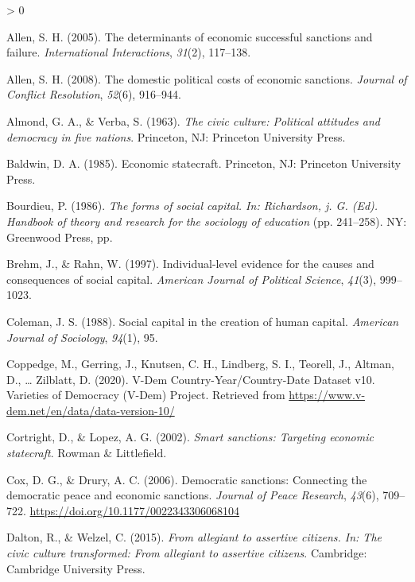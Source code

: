\documentclass[
  english,
  man]{apa6}
\newlength{\cslhangindent}
\newenvironment{CSLReferences}[2] %
 {%
  \setlength{\parindent}{0pt}
  \ifodd #1 \everypar{\setlength{\hangindent}{\cslhangindent}}\ignorespaces\fi
  \ifnum #2 > 0
  \setlength{\parskip}{#2\baselineskip}
  \fi
 }%
 {}
\begin{document}
\hypertarget{refs}{}
\begin{CSLReferences}{1}{0}
\leavevmode\hypertarget{ref-allen2005a}{}%
Allen, S. H. (2005). The determinants of economic successful sanctions and failure. \emph{International Interactions}, \emph{31}(2), 117--138.

\leavevmode\hypertarget{ref-allen2008a}{}%
Allen, S. H. (2008). The domestic political costs of economic sanctions. \emph{Journal of Conflict Resolution}, \emph{52}(6), 916--944.

\leavevmode\hypertarget{ref-a1963a}{}%
Almond, G. A., \& Verba, S. (1963). \emph{The civic culture: Political attitudes and democracy in five nations}. Princeton, NJ: Princeton University Press.

\leavevmode\hypertarget{ref-baldwin1985a}{}%
Baldwin, D. A. (1985). Economic statecraft. Princeton, NJ: Princeton University Press.

\leavevmode\hypertarget{ref-bourdieu1986a}{}%
Bourdieu, P. (1986). \emph{The forms of social capital. In: Richardson, j. G. (Ed). Handbook of theory and research for the sociology of education} (pp. 241--258). NY: Greenwood Press, pp.

\leavevmode\hypertarget{ref-brehm1997a}{}%
Brehm, J., \& Rahn, W. (1997). Individual-level evidence for the causes and consequences of social capital. \emph{American Journal of Political Science}, \emph{41}(3), 999--1023.

\leavevmode\hypertarget{ref-coleman1988a}{}%
Coleman, J. S. (1988). Social capital in the creation of human capital. \emph{American Journal of Sociology}, \emph{94}(1), 95.

\leavevmode\hypertarget{ref-coppedge2020a}{}%
Coppedge, M., Gerring, J., Knutsen, C. H., Lindberg, S. I., Teorell, J., Altman, D., \ldots{} Zilblatt, D. (2020). {V-Dem Country-Year/Country-Date Dataset v10}. Varieties of Democracy (V-Dem) Project. Retrieved from \url{https://www.v-dem.net/en/data/data-version-10/}

\leavevmode\hypertarget{ref-cortright2002a}{}%
Cortright, D., \& Lopez, A. G. (2002). \emph{Smart sanctions: Targeting economic statecraft}. Rowman \& Littlefield.

\leavevmode\hypertarget{ref-cox2006a}{}%
Cox, D. G., \& Drury, A. C. (2006). Democratic sanctions: Connecting the democratic peace and economic sanctions. \emph{Journal of Peace Research}, \emph{43}(6), 709--722. \url{https://doi.org/10.1177/0022343306068104}

\leavevmode\hypertarget{ref-dalton2015a}{}%
Dalton, R., \& Welzel, C. (2015). \emph{From allegiant to assertive citizens. In: The civic culture transformed: From allegiant to assertive citizens}. Cambridge: Cambridge University Press.


\end{CSLReferences}
\end{document}
